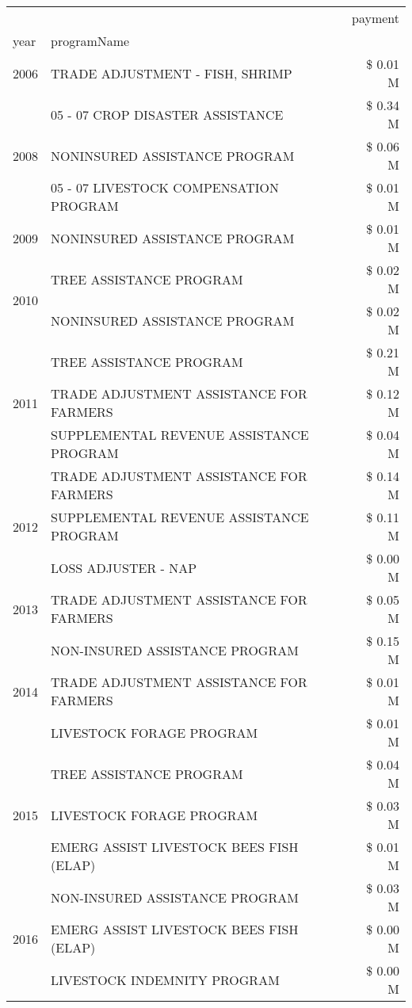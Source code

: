\begin{tabular}{llr}
\toprule
 &  & payment \\
year & programName &  \\
\midrule
2006 & TRADE ADJUSTMENT - FISH, SHRIMP & \$ 0.01 M \\
\cline{1-3}
\multirow[t]{3}{*}{2008} & 05 - 07 CROP DISASTER ASSISTANCE & \$ 0.34 M \\
 & NONINSURED ASSISTANCE PROGRAM & \$ 0.06 M \\
 & 05 - 07 LIVESTOCK COMPENSATION PROGRAM & \$ 0.01 M \\
\cline{1-3}
2009 & NONINSURED ASSISTANCE PROGRAM & \$ 0.01 M \\
\cline{1-3}
\multirow[t]{2}{*}{2010} & TREE ASSISTANCE PROGRAM & \$ 0.02 M \\
 & NONINSURED ASSISTANCE PROGRAM & \$ 0.02 M \\
\cline{1-3}
\multirow[t]{3}{*}{2011} & TREE ASSISTANCE PROGRAM & \$ 0.21 M \\
 & TRADE ADJUSTMENT ASSISTANCE FOR FARMERS & \$ 0.12 M \\
 & SUPPLEMENTAL REVENUE ASSISTANCE PROGRAM & \$ 0.04 M \\
\cline{1-3}
\multirow[t]{3}{*}{2012} & TRADE ADJUSTMENT ASSISTANCE FOR FARMERS & \$ 0.14 M \\
 & SUPPLEMENTAL REVENUE ASSISTANCE PROGRAM & \$ 0.11 M \\
 & LOSS ADJUSTER - NAP & \$ 0.00 M \\
\cline{1-3}
2013 & TRADE ADJUSTMENT ASSISTANCE FOR FARMERS & \$ 0.05 M \\
\cline{1-3}
\multirow[t]{3}{*}{2014} & NON-INSURED ASSISTANCE PROGRAM & \$ 0.15 M \\
 & TRADE ADJUSTMENT ASSISTANCE FOR FARMERS & \$ 0.01 M \\
 & LIVESTOCK FORAGE PROGRAM & \$ 0.01 M \\
\cline{1-3}
\multirow[t]{3}{*}{2015} & TREE ASSISTANCE PROGRAM & \$ 0.04 M \\
 & LIVESTOCK FORAGE PROGRAM & \$ 0.03 M \\
 & EMERG ASSIST LIVESTOCK BEES FISH (ELAP) & \$ 0.01 M \\
\cline{1-3}
\multirow[t]{3}{*}{2016} & NON-INSURED ASSISTANCE PROGRAM                & \$ 0.03 M \\
 & EMERG ASSIST LIVESTOCK BEES FISH (ELAP)       & \$ 0.00 M \\
 & LIVESTOCK INDEMNITY PROGRAM                   & \$ 0.00 M \\

\end{tabular}
